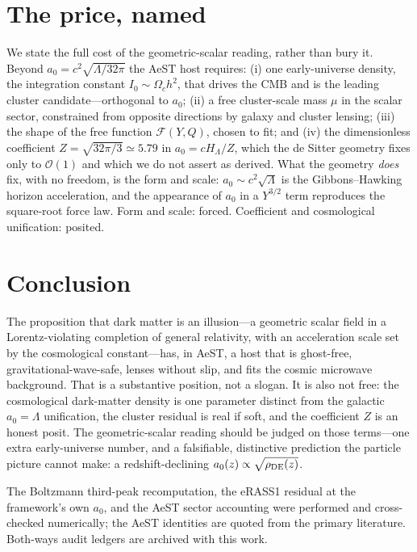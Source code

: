 \documentclass[aps,prd,twocolumn,10pt,nofootinbib,superscriptaddress]{revtex4-2}
\begin{document}
\section{The price, named}
We state the full cost of the geometric-scalar reading, rather than bury it. Beyond $a_0=c^2\sqrt{\Lambda/32\pi}$ the
AeST host requires: (i) one early-universe density, the integration constant $I_0\sim\Omega_c h^2$, that drives the
CMB and is the leading cluster candidate---orthogonal to $a_0$; (ii) a free cluster-scale mass $\mu$ in the scalar
sector, constrained from opposite directions by galaxy and cluster lensing; (iii) the shape of the free function
$\mathcal{F}(Y,Q)$, chosen to fit; and (iv) the dimensionless coefficient $Z=\sqrt{32\pi/3}\simeq5.79$ in
$a_0=cH_\Lambda/Z$, which the de Sitter geometry fixes only to $\mathcal{O}(1)$ and which we do not assert as derived.
What the geometry \emph{does} fix, with no freedom, is the form and scale: $a_0\sim c^2\sqrt{\Lambda}$ is the
Gibbons--Hawking horizon acceleration, and the appearance of $a_0$ in a $Y^{3/2}$ term reproduces the square-root
force law. Form and scale: forced. Coefficient and cosmological unification: posited.

\section{Conclusion}
The proposition that dark matter is an illusion---a geometric scalar field in a Lorentz-violating completion of
general relativity, with an acceleration scale set by the cosmological constant---has, in AeST, a host that is
ghost-free, gravitational-wave-safe, lenses without slip, and fits the cosmic microwave background. That is a
substantive position, not a slogan. It is also not free: the cosmological dark-matter density is one parameter
distinct from the galactic $a_0=\Lambda$ unification, the cluster residual is real if soft, and the coefficient $Z$
is an honest posit. The geometric-scalar reading should be judged on those terms---one extra early-universe number,
and a falsifiable, distinctive prediction the particle picture cannot make: a redshift-declining
$a_0(z)\propto\sqrt{\rho_{\rm DE}(z)}$.

\begin{acknowledgments}
The Boltzmann third-peak recomputation, the eRASS1 residual at the framework's own $a_0$, and the AeST sector
accounting were performed and cross-checked numerically; the AeST identities are quoted from the primary literature.
Both-ways audit ledgers are archived with this work.
\end{acknowledgments}
\end{document}
